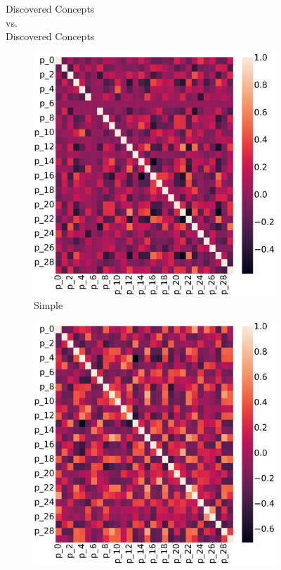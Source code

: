 \begin{table}
\label{cem:tab:other-scores}
\end{table}

\begin{figure}
\centering
\begin{minipage}{.49\textwidth}
	\centering
	{\small\sc Discovered Concepts\\vs.\\Discovered Concepts}\\
	\begin{subfigure}{.49\textwidth}
		\includegraphics[width=\textwidth]{imgs/cem/KANDY_2-vit-continual-notriplet_pp.pdf}
		\caption{Simple}
	\end{subfigure}
	\begin{subfigure}{.49\textwidth}
		\includegraphics[width=\textwidth]{imgs/cem/KANDY_2-vit-continual-triplet_pp.pdf}

\end{subfigure}
\end{minipage}
\end{figure}
